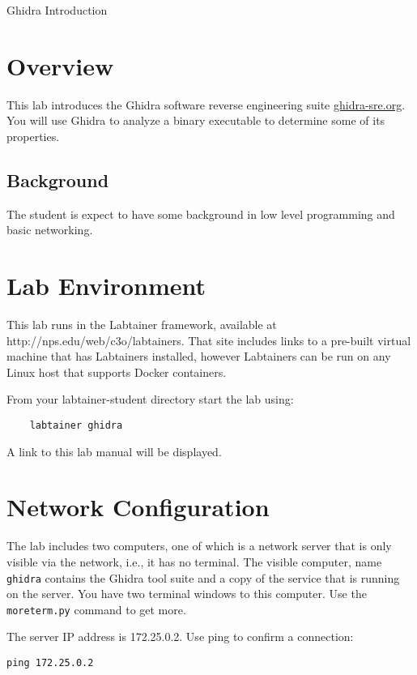 


\begin{center}
{\LARGE Ghidra Introduction}
\vspace{0.1in}\\
\end{center}


\section{Overview}
This lab introduces the Ghidra software reverse engineering suite \url{ghidra-sre.org}.
You will use Ghidra to analyze a binary executable to determine some of its properties.

\subsection {Background}
The student is expect to have some background in low level programming and basic networking.

\section{Lab Environment}
This lab runs in the Labtainer framework,
available at http://nps.edu/web/c3o/labtainers.
That site includes links to a pre-built virtual machine
that has Labtainers installed, however Labtainers can
be run on any Linux host that supports Docker containers.

From your labtainer-student directory start the lab using:
\begin{verbatim}
    labtainer ghidra
\end{verbatim}
\noindent A link to this lab manual will be displayed.  

\section{Network Configuration}
The lab includes two computers, one of which is a network server that is
only visible via the network, i.e., it has no terminal.  The visible computer,
name {\tt ghidra} contains the Ghidra tool suite and a copy of the service that
is running on the server.  You have two terminal windows to this computer. Use the
{\tt moreterm.py} command to get more.

The server IP address is 172.25.0.2.  Use ping to confirm a connection:
\begin{verbatim}
ping 172.25.0.2
\end{verbatim}

